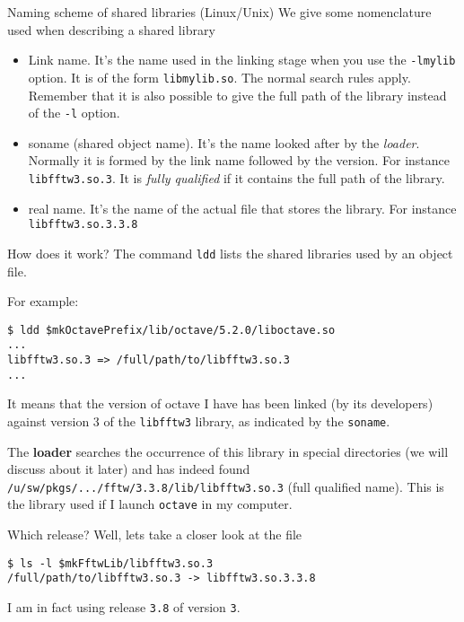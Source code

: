 \documentclass[10pt]{beamer}
\begin{document}
\begin{frame}{Naming scheme of shared libraries (Linux/Unix)}
  We give some nomenclature used when describing a shared library

  \begin{itemize}
  \item Link name. It's the name used in the linking stage when
    you use the \texttt{-lmylib} option.  It is of the
    form \texttt{libmylib.so}. The normal search rules
    apply. Remember that it is also possible to give the full path of
    the library instead of the \texttt{-l} option.
  \item soname (shared object name).  It's the name looked after
    by the \emph{loader}.  Normally it is formed by the link name
    followed by the version.  For instance
    \texttt{libfftw3.so.3}. It is \emph{fully
    qualified} if it contains the full path of the library.
  \item real name. It's the name of the actual file that stores the library. 
    For instance \texttt{libfftw3.so.3.3.8}
  \end{itemize}
\end{frame}


\begin{frame}[fragile]{How does it work?}  The command
  \texttt{ldd} lists the shared libraries used by an object file.

  For example:
\begin{verbatim}
$ ldd $mkOctavePrefix/lib/octave/5.2.0/liboctave.so
...
libfftw3.so.3 => /full/path/to/libfftw3.so.3
...
\end{verbatim}
It means that the version of octave I have has been linked (by its
developers) against version $3$ of the \texttt{libfftw3} library, 
as indicated by the \texttt{soname}.

The \textbf{loader} searches the occurrence of this library in special
directories (we will discuss about it later) and has indeed found
\texttt{/u/sw/pkgs/.../fftw/3.3.8/lib/libfftw3.so.3} (full qualified name). This is the library used if I launch \texttt{octave} in my computer. \smallskip

Which release? Well, lets take a closer look at the file
\begin{verbatim}
$ ls -l $mkFftwLib/libfftw3.so.3
/full/path/to/libfftw3.so.3 -> libfftw3.so.3.3.8
\end{verbatim}
I am in fact using release \texttt{3.8} of version \texttt{3}.
\end{frame}
\end{document}
